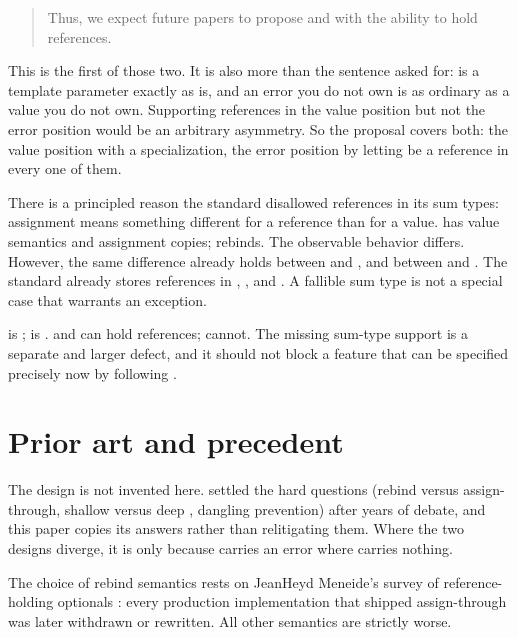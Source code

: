 \documentclass[a4paper,10pt,oneside,openany,final,article]{memoir}
\begin{document}
\begin{quote}
  Thus, we expect future papers to propose  and
   with the ability to hold references.
\end{quote}

This is the first of those two. It is also more than the sentence asked for:
 is a template parameter exactly as  is, and an error you do
not own is as ordinary as a value you do not own. Supporting references in the
value position but not the error position would be an arbitrary asymmetry.
So the proposal covers both: the value position with a specialization, the
error position by letting  be a reference in every one of them.

There is a principled reason the standard disallowed references in its sum
types: assignment means something different for a reference than for a value.
 has value semantics and assignment copies;
 rebinds. The observable behavior differs. However, the
same difference already holds between
 and , and between  and
. The standard already stores references in
, , and . A
fallible sum type is not a special case that warrants an exception.

 is ;  is
.  and  can hold references;
 cannot. The missing sum-type support is a separate and larger
defect, and it should not block a feature that can be specified precisely now
by following .

\chapter{Prior art and precedent}

The design is not invented here.  \cite{P2988R12} settled
the hard questions (rebind versus assign-through, shallow versus deep
, dangling prevention) after years of debate, and this paper
copies its answers rather than relitigating them. Where the two designs
diverge, it is only because  carries an error where
 carries nothing.

The choice of rebind semantics rests on JeanHeyd Meneide's survey of
reference-holding optionals \cite{P1683R0, REFBIND}: every production
implementation that shipped assign-through was later withdrawn or rewritten.
All other semantics are strictly worse.
\end{document}
